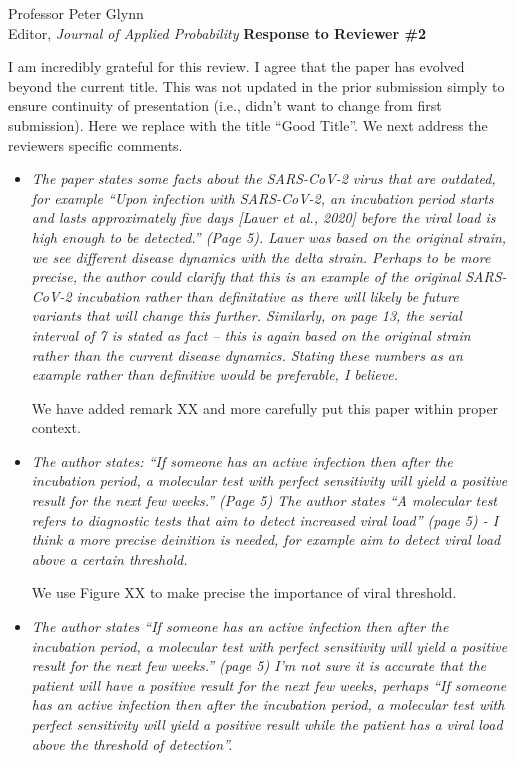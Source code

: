 \documentclass[11pt]{letter} %
\begin{document}
\begin{letter}{Professor
	Peter Glynn\\
	Editor, {\em Journal of Applied Probability}}
{\bf Response to Reviewer \#2}

I am incredibly grateful for this review.  I agree that the paper has evolved beyond the current title.  This was not updated in the prior submission simply to ensure continuity of presentation (i.e., didn't want to change from first submission).  Here we replace with the title ``Good Title''.  We next address the reviewers specific comments.

\begin{itemize}
\item {\it The paper states some facts about the SARS-CoV-2 virus that are outdated, for example “Upon infection with SARS-CoV-2, an incubation period starts and lasts approximately five days [Lauer et al., 2020] before the viral load is high enough to be detected.” (Page 5). Lauer was based on the original
strain, we see different disease dynamics with the delta strain. Perhaps to be more precise, the author could clarify that this is an example of the original SARS-CoV-2 incubation rather than definitative as there will likely be future variants that will change this further. Similarly, on page 13, the serial
interval of 7 is stated as fact – this is again based on the original strain rather than the current disease dynamics. Stating these numbers as an example rather than definitive would be preferable, I believe.}
\vspace{5mm}

We have added remark XX and more carefully put this paper within proper context.
\vspace{5mm}
\item {\it The author states: “If someone has an active infection then after the incubation period, a molecular test with perfect sensitivity will yield a positive result for the next few weeks.” (Page 5) The author states “A molecular test refers to diagnostic tests that aim to detect increased viral load” (page 5) - I think a more precise deinition is needed, for example aim to detect viral load above a certain threshold.}
\vspace{5mm}

We use Figure XX to make precise the importance of viral threshold.
\vspace{5mm}
\item {\it The author states “If someone has an active infection then after the incubation period, a molecular test with perfect sensitivity will yield a positive result for the next few weeks.” (page 5) I’m not sure it is accurate that the patient will have a positive result for the next few weeks, perhaps “If someone has an active infection then after the incubation period, a molecular test with perfect sensitivity will yield a positive result while the patient has a viral load above the threshold of detection”.}
\vspace{5mm}


\end{itemize}
\end{letter}
\end{document}
